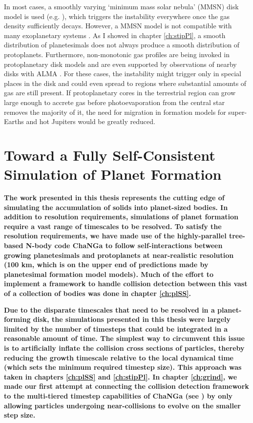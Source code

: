 In most cases, a smoothly varying `minimum mass solar nebula' (MMSN) disk model is used (e.g. \cite{kominami02, dawson15}), which triggers the instability everywhere once the gas density sufficiently decays. However, a MMSN model is not compatible with many exoplanetary systems \cite{chiang13, schlichting14}. As I showed in chapter \ref{ch:stipPl}, a smooth distribution of planetesimals does not always produce a smooth distribution of protoplanets. Furthermore, non-monotonic gas profiles are being invoked in protoplanetary disk models \cite{chatterjee14, ogihara15} and are even supported by observations of nearby disks with ALMA \cite{isella16, andrews16}. For these cases, the instability might trigger only in special places in the disk and could even spread to regions where substantial amounts of gas are still present. If protoplanetary cores in the terrestrial region can grow large enough to accrete gas before photoevaporation from the central star removes the majority of it, the need for migration in formation models for super-Earths and hot Jupiters would be greatly reduced.

\section{Toward a Fully Self-Consistent Simulation of Planet Formation}

\textbf{The work presented in this thesis represents the cutting edge of simulating the accumulation of solids into planet-sized bodies. In addition to resolution requirements, simulations of planet formation require a vast range of timescales to be resolved. To satisfy the resolution requirements, we have made use of the highly-parallel tree-based N-body code {\sc ChaNGa} to follow self-interactions between growing planetesimals and protoplanets at near-realistic resolution (100 km, which is on the upper end of predictions made by planetesimal formation model models). Much of the effort to implement a framework to handle collision detection between this vast of a collection of bodies was done in chapter \ref{ch:plSS}.}

\textbf{Due to the disparate timescales that need to be resolved in a planet-forming disk, the simulations presented in this thesis were largely limited by the number of timesteps that could be integrated in a reasonable amount of time. The simplest way to circumvent this issue is to artificially inflate the collision cross sections of particles, thereby reducing the growth timescale relative to the local dynamical time (which sets the minimum required timestep size). This approach was taken in chapters \ref{ch:plSS} and \ref{ch:stipPl}. In chapter \ref{ch:grind}, we made our first attempt at connecting the collision detection framework to the multi-tiered timestep capabilities of {\sc ChaNGa} (see \cite{menon15}) by only allowing particles undergoing near-collisions to evolve on the smaller step size.}


